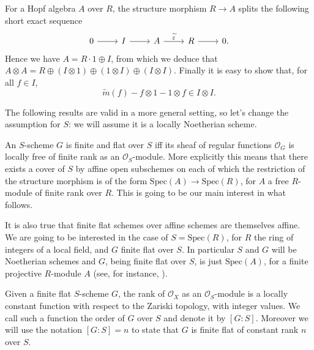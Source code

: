 \begin{defn}
	For a Hopf algebra $A$ over $R$,
	the structure morphism $R \to A$
	splits the following short exact sequence
	\begin{equation*}
	\begin{tikzcd}
		0 \arrow[r, "", rightarrow] &
		I \arrow[r, "", rightarrow] &
		A \arrow[r, "\widetilde{\varepsilon}", rightarrow] &
		R \arrow[r, "", rightarrow] &
		0.
	\end{tikzcd}
	\end{equation*}
	Hence we have $A = R \cdot 1 \oplus I$,
	from which we deduce that $A \otimes A = R \oplus \left( I \otimes 1 \right) \oplus
	\left( 1 \otimes I \right) \oplus \left( I \otimes I \right)$.
	Finally it is easy to show that, for all $f \in I$,
	\begin{equation*}
		\widetilde{m}(f) - f \otimes 1 - 1 \otimes f \in I \otimes I
	.\end{equation*} 
\end{defn}


\noindent
The following results are valid in a more general setting, so let's change
the assumption for $S$: we will assume it is a locally Noetherian scheme.
\begin{rem}\label{rem:finiteGSMotivation}
	An $S$-scheme $G$ is finite and flat over $S$ iff its sheaf of regular functions
	$\mathcal{O}_G$ is locally free of finite rank as an $\mathcal{O}_S$-module.
	More explicitly this means that there exists a cover of $S$ by affine open subschemes
	on each of which the restriction of the structure morphism is of the form
	$\mathrm{Spec}(A) \to \mathrm{Spec}(R)$, for $A$ a free $R$-module of finite rank over $R$. 
	This is going to be our main interest in what follows.

	It is also true that finite flat schemes over affine schemes
	are themselves affine. 
	We are going to be interested in the case of $S = \mathrm{Spec}(R)$,
	for $R$ the ring of integers of a local field,
	and $G$ finite flat over $S$.
	In particular $S$ and $G$ will be Noetherian schemes
	and $G$, being finite flat over $S$, is just $\mathrm{Spec}(A)$,
	for a finite projective $R$-module $A$ (see, for instance, 
	\cite[\href{https://stacks.math.columbia.edu/tag/00NX}{Lemma 00NX}]{SP}).
\end{rem}


\begin{defn}
	Given a finite flat $S$-scheme $G$, the rank of $\mathcal{O}_X$ as
	an $\mathcal{O}_S$-module is a locally constant function with respect
	to the Zariski topology, with integer values.
	We call such a function the order of $G$ over $S$ and denote it by $[G:S]$.
	Moreover we will use the notation $[G:S] = n$ to state that $G$ is finite flat of
	constant rank $n$ over $S$.
\end{defn}


